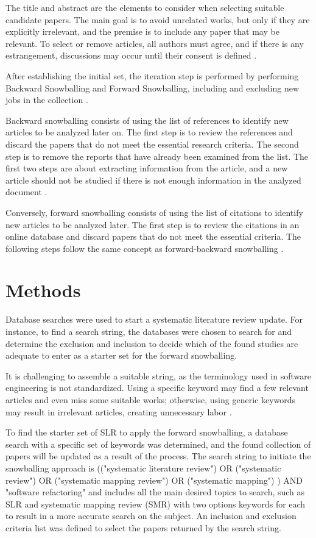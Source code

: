 The title and abstract are the elements to consider when selecting suitable candidate papers. The main goal is to avoid unrelated works, but only if they are explicitly irrelevant, and the premise is to include any paper that may be relevant. To select or remove articles, all authors must agree, and if there is any estrangement, discussions may occur until their consent is defined \textcite{Kitchenham2013}.

After establishing the initial set, the iteration step is performed by performing Backward Snowballing and Forward Snowballing, including and excluding new jobs in the collection \cite{Wohlin2014}.

Backward snowballing consists of using the list of references to identify new articles to be analyzed later on. The first step is to review the references and discard the papers that do not meet the essential research criteria. The second step is to remove the reports that have already been examined from the list. The first two steps are about extracting information from the article, and a new article should not be studied if there is not enough information in the analyzed document \cite{Wohlin2014}.

Conversely, forward snowballing consists of using the list of citations to identify new articles to be analyzed later. The first step is to review the citations in an online database and discard papers that do not meet the essential criteria. The following steps follow the same concept as forward-backward snowballing \cite{Felizardo2016}.

\section{Methods}
\label{sec-methods}
Database searches were used to start a systematic literature review update. For instance, to find a search string, the databases were chosen to search for and determine the exclusion and inclusion to decide which of the found studies are adequate to enter as a starter set for the forward snowballing.

It is challenging to assemble a suitable string, as the terminology used in software engineering is not standardized. Using a specific keyword may find a few relevant articles and even miss some suitable works; otherwise, using generic keywords may result in irrelevant articles, creating unnecessary labor \cite{Wohlin2014}.

To find the starter set of SLR to apply the forward snowballing, a database search with a specific set of keywords was determined, and the found collection of papers will be updated as a result of the process. The search string to initiate the snowballing approach is (("systematic literature review") OR ("systematic review") OR ("systematic mapping review") OR ("systematic mapping") ) AND "software refactoring" and includes all the main desired topics to search, such as SLR and systematic mapping review (SMR) with two options keywords for each to result in a more accurate search on the subject. An inclusion and exclusion criteria list was defined to select the papers returned by the search string.

